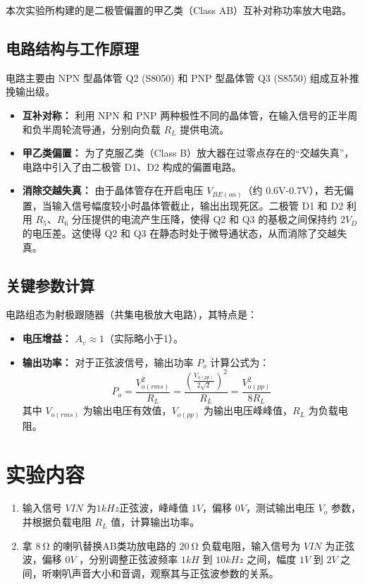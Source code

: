 \documentclass[UTF8, a4paper]{ctexrep} %
\begin{document}
本次实验所构建的是二极管偏置的甲乙类（Class AB）互补对称功率放大电路。

\subsection{电路结构与工作原理}
电路主要由 NPN 型晶体管 Q2 (S8050) 和 PNP 型晶体管 Q3 (S8550) 组成互补推挽输出级。
\begin{itemize}
    \item \textbf{互补对称：} 利用 NPN 和 PNP 两种极性不同的晶体管，在输入信号的正半周和负半周轮流导通，分别向负载 $R_L$ 提供电流。
    \item \textbf{甲乙类偏置：} 为了克服乙类（Class B）放大器在过零点存在的“交越失真”，电路中引入了由二极管 D1、D2 构成的偏置电路。
    \item \textbf{消除交越失真：} 由于晶体管存在开启电压 $V_{BE(on)}$（约 0.6V-0.7V），若无偏置，当输入信号幅度较小时晶体管截止，输出出现死区。二极管 D1 和 D2 利用 $R_5$、$R_6$ 分压提供的电流产生压降，使得 Q2 和 Q3 的基极之间保持约 $2V_D$ 的电压差。这使得 Q2 和 Q3 在静态时处于微导通状态，从而消除了交越失真。
\end{itemize}

\subsection{关键参数计算}
电路组态为射极跟随器（共集电极放大电路），其特点是：
\begin{itemize}
    \item \textbf{电压增益：} $A_v \approx 1$（实际略小于1）。
    \item \textbf{输出功率：} 对于正弦波信号，输出功率 $P_o$ 计算公式为：
    \begin{equation}
        P_o = \frac{V_{o(rms)}^2}{R_L} = \frac{\left(\frac{V_{o(pp)}}{2\sqrt{2}}\right)^2}{R_L} = \frac{V_{o(pp)}^2}{8 R_L}
    \end{equation}
    其中 $V_{o(rms)}$ 为输出电压有效值，$V_{o(pp)}$ 为输出电压峰峰值，$R_L$ 为负载电阻。
\end{itemize}

\section{实验内容}
\begin{enumerate}
    \item 输入信号 $VIN$ 为$1kHz$正弦波，峰峰值 $1V$，偏移 $0V$，测试输出电压 $V_o$ 参数，并根据负载电阻 $R_L$ 值，计算输出功率。
    \item 拿 $\SI{8}{\ohm}$ 的喇叭替换AB类功放电路的 $\SI{20}{\ohm}$ 负载电阻，输入信号为 $VIN$ 为正弦波，偏移 $0V$ ，分别调整正弦波频率 $1kH$ 到 $10kHz$ 之间，幅度 $1V$ 到 $2V$ 之间，听喇叭声音大小和音调，观察其与正弦波参数的关系。
\end{enumerate}
\end{document}
